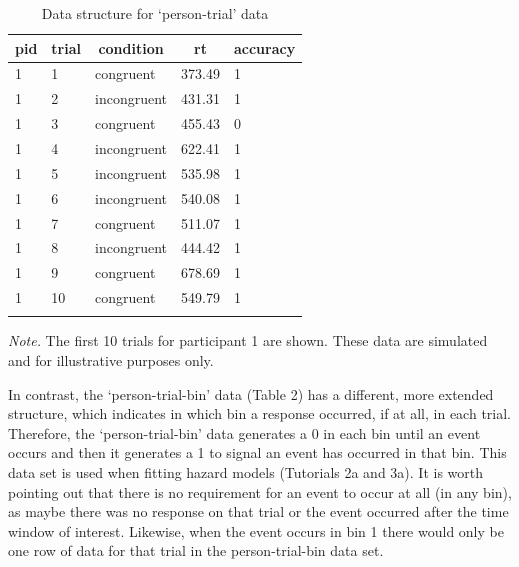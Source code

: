 \documentclass[
  man, donotrepeattitle,floatsintext]{apa6}
\begin{document}
\begin{table}[H]

\begin{center}
\begin{threeparttable}

\caption{\label{tab:ca-data-table}Data structure for `person-trial' data}

\begin{tabular}{lllll}
\toprule
pid & \multicolumn{1}{c}{trial} & \multicolumn{1}{c}{condition} & \multicolumn{1}{c}{rt} & \multicolumn{1}{c}{accuracy}\\
\midrule
1 & 1 & congruent & 373.49 & 1\\
1 & 2 & incongruent & 431.31 & 1\\
1 & 3 & congruent & 455.43 & 0\\
1 & 4 & incongruent & 622.41 & 1\\
1 & 5 & incongruent & 535.98 & 1\\
1 & 6 & incongruent & 540.08 & 1\\
1 & 7 & congruent & 511.07 & 1\\
1 & 8 & incongruent & 444.42 & 1\\
1 & 9 & congruent & 678.69 & 1\\
1 & 10 & congruent & 549.79 & 1\\
\bottomrule
\addlinespace
\end{tabular}

\begin{tablenotes}[para]
\normalsize{\textit{Note.} The first 10 trials for participant 1 are shown. These data are simulated and for illustrative purposes only.}
\end{tablenotes}

\end{threeparttable}
\end{center}

\end{table}

In contrast, the `person-trial-bin' data (Table 2) has a different, more extended structure, which indicates in which bin a response occurred, if at all, in each trial. Therefore, the `person-trial-bin' data generates a 0 in each bin until an event occurs and then it generates a 1 to signal an event has occurred in that bin. This data set is used when fitting hazard models (Tutorials 2a and 3a). It is worth pointing out that there is no requirement for an event to occur at all (in any bin), as maybe there was no response on that trial or the event occurred after the time window of interest. Likewise, when the event occurs in bin 1 there would only be one row of data for that trial in the person-trial-bin data set.
\end{document}
